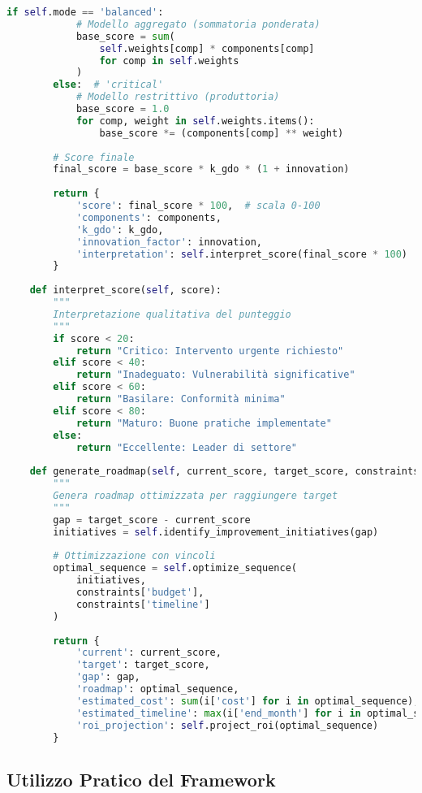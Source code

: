 \begin{lstlisting}[language=Python, caption=Framework GIST calibrato]
        if self.mode == 'balanced':
            # Modello aggregato (sommatoria ponderata)
            base_score = sum(
                self.weights[comp] * components[comp] 
                for comp in self.weights
            )
        else:  # 'critical'
            # Modello restrittivo (produttoria)
            base_score = 1.0
            for comp, weight in self.weights.items():
                base_score *= (components[comp] ** weight)
                
        # Score finale
        final_score = base_score * k_gdo * (1 + innovation)
        
        return {
            'score': final_score * 100,  # scala 0-100
            'components': components,
            'k_gdo': k_gdo,
            'innovation_factor': innovation,
            'interpretation': self.interpret_score(final_score * 100)
        }
        
    def interpret_score(self, score):
        """
        Interpretazione qualitativa del punteggio
        """
        if score < 20:
            return "Critico: Intervento urgente richiesto"
        elif score < 40:
            return "Inadeguato: Vulnerabilità significative"
        elif score < 60:
            return "Basilare: Conformità minima"
        elif score < 80:
            return "Maturo: Buone pratiche implementate"
        else:
            return "Eccellente: Leader di settore"
            
    def generate_roadmap(self, current_score, target_score, constraints):
        """
        Genera roadmap ottimizzata per raggiungere target
        """
        gap = target_score - current_score
        initiatives = self.identify_improvement_initiatives(gap)
        
        # Ottimizzazione con vincoli
        optimal_sequence = self.optimize_sequence(
            initiatives,
            constraints['budget'],
            constraints['timeline']
        )
        
        return {
            'current': current_score,
            'target': target_score,
            'gap': gap,
            'roadmap': optimal_sequence,
            'estimated_cost': sum(i['cost'] for i in optimal_sequence),
            'estimated_timeline': max(i['end_month'] for i in optimal_sequence),
            'roi_projection': self.project_roi(optimal_sequence)
        }
\end{lstlisting}

\subsection{Utilizzo Pratico del Framework}


